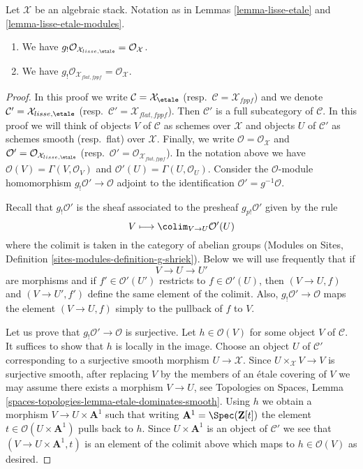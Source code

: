 \begin{lemma}
\label{lemma-lisse-etale-structure-sheaf}
Let $\mathcal{X}$ be an algebraic stack. Notation as in
Lemmas \ref{lemma-lisse-etale} and \ref{lemma-lisse-etale-modules}.
\begin{enumerate}
\item We have $g_!\mathcal{O}_{\mathcal{X}_{lisse,\etale}} =
\mathcal{O}_\mathcal{X}$.
\item We have $g_!\mathcal{O}_{\mathcal{X}_{flat, fppf}} =
\mathcal{O}_\mathcal{X}$.
\end{enumerate}
\end{lemma}

\begin{proof}
In this proof we write
$\mathcal{C} = \mathcal{X}_\etale$
(resp.\ $\mathcal{C} = \mathcal{X}_{fppf}$)
and we denote
$\mathcal{C}' = \mathcal{X}_{lisse,\etale}$
(resp.\ $\mathcal{C}' = \mathcal{X}_{flat, fppf}$).
Then $\mathcal{C}'$ is a full subcategory of $\mathcal{C}$.
In this proof we will think of objects $V$ of $\mathcal{C}$
as schemes over $\mathcal{X}$ and objects $U$ of $\mathcal{C}'$
as schemes smooth (resp.\ flat) over $\mathcal{X}$.
Finally, we write $\mathcal{O} = \mathcal{O}_\mathcal{X}$
and $\mathcal{O}' = \mathcal{O}_{\mathcal{X}_{lisse,\etale}}$
(resp.\ $\mathcal{O}' = \mathcal{O}_{\mathcal{X}_{flat,fppf}}$).
In the notation above we have $\mathcal{O}(V) = \Gamma(V, \mathcal{O}_V)$
and $\mathcal{O}'(U) = \Gamma(U, \mathcal{O}_U)$.
Consider the $\mathcal{O}$-module homomorphism
$g_!\mathcal{O}' \to \mathcal{O}$
adjoint to the identification $\mathcal{O}' = g^{-1}\mathcal{O}$.

\medskip\noindent
Recall that $g_!\mathcal{O}'$ is the sheaf associated to the presheaf
$g_{p!}\mathcal{O}'$ given by the rule
$$
V \longmapsto \colim_{V \to U} \mathcal{O}'(U)
$$
where the colimit is taken in the category of abelian groups
(Modules on Sites, Definition \ref{sites-modules-definition-g-shriek}).
Below we will use frequently that if
$$
V \to U \to U'
$$
are morphisms and if $f' \in \mathcal{O}'(U')$ restricts to
$f \in \mathcal{O}'(U)$, then $(V \to U, f)$ and $(V \to U', f')$
define the same element of the colimit. Also,
$g_!\mathcal{O}' \to \mathcal{O}$ maps the element
$(V \to U, f)$ simply to the pullback of $f$ to $V$.

\medskip\noindent
Let us prove that $g_!\mathcal{O}' \to \mathcal{O}$ is surjective.
Let $h \in \mathcal{O}(V)$ for some object $V$ of $\mathcal{C}$.
It suffices to show that $h$ is locally in the image. Choose an object
$U$ of $\mathcal{C}'$ corresponding to a surjective smooth morphism
$U \to \mathcal{X}$. Since $U \times_\mathcal{X} V \to V$ is surjective
smooth, after replacing $V$ by the members of an \'etale covering of $V$
we may assume there exists a morphism $V \to U$, see
Topologies on Spaces, Lemma
\ref{spaces-topologies-lemma-etale-dominates-smooth}. Using $h$ we obtain
a morphism $V \to U \times \mathbf{A}^1$ such that writing
$\mathbf{A}^1 = \Spec(\mathbf{Z}[t])$ the element
$t \in \mathcal{O}(U \times \mathbf{A}^1)$ pulls back to $h$.
Since $U \times \mathbf{A}^1$ is an object of $\mathcal{C}'$
we see that $(V \to U \times \mathbf{A}^1, t)$
is an element of the colimit above which maps to $h \in \mathcal{O}(V)$
as desired.


\end{proof}
